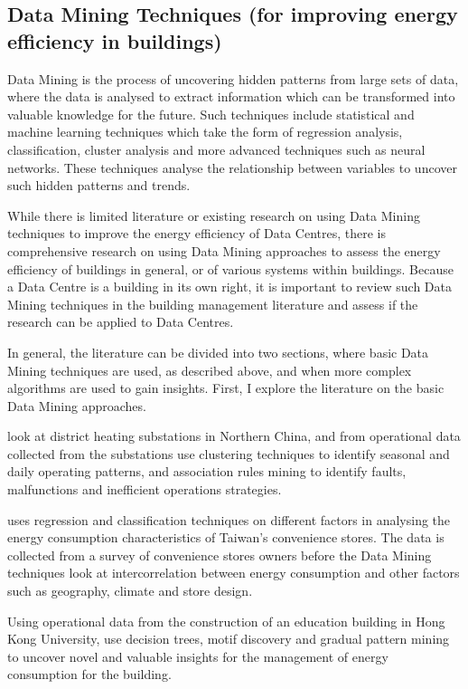 \documentclass[12pt]{scrartcl}
\begin{document}
\subsection{Data Mining Techniques (for improving energy efficiency in buildings)}  
\label{subsec:[Data Mining Techniques]}
Data Mining is the process of uncovering hidden patterns from large sets of data, where the data is analysed to extract information which can be transformed into valuable knowledge for the future. Such techniques include statistical and machine learning techniques which take the form of regression analysis, classification, cluster analysis and more advanced techniques such as neural networks. These techniques analyse the relationship between variables to uncover such hidden patterns and trends.  

While there is limited literature or existing research on using Data Mining techniques to improve the energy efficiency of Data Centres, there is comprehensive research on using Data Mining approaches to assess the energy efficiency of buildings in general, or of various systems within buildings. Because a Data Centre is a building in its own right, it is important to review such Data Mining techniques in the building management literature and assess if the research can be applied to Data Centres.   

In general, the literature can be divided into two sections, where basic Data Mining techniques are used, as described above, and when more complex algorithms are used to gain insights. First, I explore the literature on the basic Data Mining approaches.
 
\citet{XUE2017926} look at district heating substations in Northern China, and from operational data collected from the substations use clustering techniques to identify seasonal and daily operating patterns, and association rules mining to identify faults, malfunctions and inefficient operations strategies. 

\citet{JEFFREYKUO2018120} uses regression and classification techniques on different factors in analysing the energy consumption characteristics of Taiwan's convenience stores. The data is collected from a survey of convenience stores owners before the Data Mining techniques look at intercorrelation between energy consumption and other factors such as geography, climate and store design. 

Using operational data from the construction of an education building in Hong Kong University, \citet{FAN2018296} use decision trees, motif discovery and gradual pattern mining to uncover novel and valuable insights for the management of energy consumption for the building.
\end{document}

